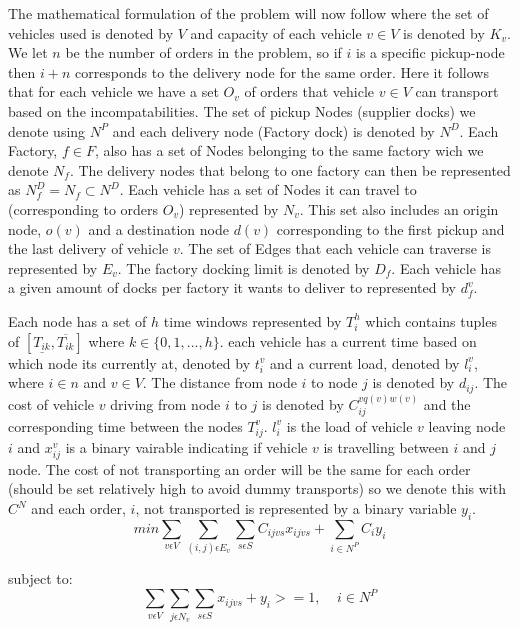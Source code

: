 \documentclass[a4paper,12pt]{article}
\begin{document}
The mathematical formulation of the problem will now follow where the set of vehicles used is denoted by $V$ and capacity of each vehicle $v \in V$ is denoted by $K_v$. We let $n$ be the number of orders in the problem, so if $i$ is a specific pickup-node then $i+n$ corresponds to the delivery node for the same order. Here it follows that for each vehicle we have a set $O_v$ of orders that vehicle $v \in V$ can transport based on the incompatabilities. The set of pickup Nodes (supplier docks) we denote using $N^P$ and each delivery node (Factory dock) is denoted by $N^D$. Each Factory, $f \in F$, also has a set of Nodes belonging to the same factory wich we denote $N_f$. The delivery nodes that belong to one factory can then be represented as $N_f^D = N_f \subset N^D$. Each vehicle has a set of Nodes it can travel to (corresponding to orders $O_v$) represented by $N_v$. This set also includes an origin node, $o(v)$ and a destination node $d(v)$ corresponding to the first pickup and the last delivery of vehicle $v$. The set of Edges that each vehicle can traverse is represented by $E_v$. The factory docking limit is denoted by $D_f$. Each vehicle has a given amount of docks per factory it wants to deliver to represented by $d_{f}^v$. \par 
Each node has a set of $h$ time windows represented by $T_i^h$ which contains tuples of $[ \underline{T_{ik}},  \overline{T_{ik}} ]$ where $k \in \{0,1,...,h\}$. each vehicle has a current time based on which node its currently at, denoted by $t_{i}^v$ and a current load, denoted by $l_{i}^v$, where $i \in n$ and $v \in V$. The distance from node $i$ to node $j$ is denoted by $d_{ij}$. The cost of vehicle $v$ driving from node $i$ to $j$ is denoted by $C_{ij}^{vq(v)w(v)}$ and the corresponding time between the nodes $T_{ij}^v$. $l_{i}^v$ is the load of vehicle $v$ leaving node $i$ and $x_{ij}^v$ is a binary vairable indicating if vehicle $v$ is travelling between $i$ and $j$ node. The cost of not transporting an order will be the same for each order (should be set relatively high to avoid dummy transports) so we denote this with $C^N$ and each order, $i$,  not transported is represented by a binary variable $y_i$. 
\begin{equation}
\label{eq:1}
min\sum_{v\epsilon V} \sum_{(i,j)\epsilon E_v} \sum_{s \epsilon S} C_{ijvs}x_{ijvs} + \sum_{i\in N^P}C_iy_i
\end{equation}

subject to:
\begin{equation} \label{eq:2}
    \sum_{v\epsilon V}\sum_{j\epsilon N_v}\sum_{s\epsilon S} x_{ijvs} + y_i >= 1, ~~~~~ i \in N^P
\end{equation}
\end{document}
